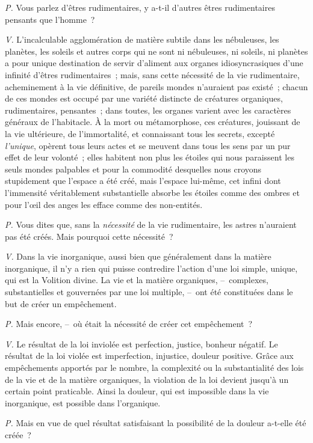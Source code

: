 \documentclass[french,twoside]{book} %
\begin{document}
\emph{P.} Vous parlez d’êtres rudimentaires, y a-t-il d’autres êtres rudimentaires pensants que l’homme ?\par
\emph{V.} L’incalculable agglomération de matière subtile dans les nébuleuses, les planètes, les soleils et autres corps qui ne sont ni nébuleuses, ni soleils, ni planètes a pour unique destination de servir d’aliment aux organes idiosyncrasiques d’une infinité d’êtres rudimentaires ; mais, sans cette nécessité de la vie rudimentaire, acheminement à la vie définitive, de pareils mondes n’auraient pas existé ; chacun de ces mondes est occupé par une variété distincte de créatures organiques, rudimentaires, pensantes ; dans toutes, les organes varient avec les caractères généraux de l’habitacle. À la mort ou métamorphose, ces créatures, jouissant de la vie ultérieure, de l’immortalité, et connaissant tous les secrets, excepté \emph{l’unique}, opèrent tous leurs actes et se meuvent dans tous les sens par un pur effet de leur volonté ; elles habitent non plus les étoiles qui nous paraissent les seuls mondes palpables et pour la commodité desquelles nous croyons stupidement que l’espace a été créé, mais l’espace lui-même, cet infini dont l’immensité véritablement substantielle absorbe les étoiles comme des ombres et pour l’œil des anges les efface comme des non-entités.\par
\emph{P.} Vous dites que, sans la \emph{nécessité} de la vie rudimentaire, les astres n’auraient pas été créés. Mais pourquoi cette nécessité ?\par
\emph{V.} Dans la vie inorganique, aussi bien que généralement dans la matière inorganique, il n’y a rien qui puisse contredire l’action d’une loi simple, unique, qui est la Volition divine. La vie et la matière organiques, – complexes, substantielles et gouvernées par une loi multiple, – ont été constituées dans le but de créer un empêchement.\par
\emph{P.} Mais encore, – où était la nécessité de créer cet empêchement ?\par
\emph{V.} Le résultat de la loi inviolée est perfection, justice, bonheur négatif. Le résultat de la loi violée est imperfection, injustice, douleur positive. Grâce aux empêchements apportés par le nombre, la complexité ou la substantialité des lois de la vie et de la matière organiques, la violation de la loi devient jusqu’à un certain point praticable. Ainsi la douleur, qui est impossible dans la vie inorganique, est possible dans l’organique.\par
\emph{P.} Mais en vue de quel résultat satisfaisant la possibilité de la douleur a-t-elle été créée ?\par
\end{document}
